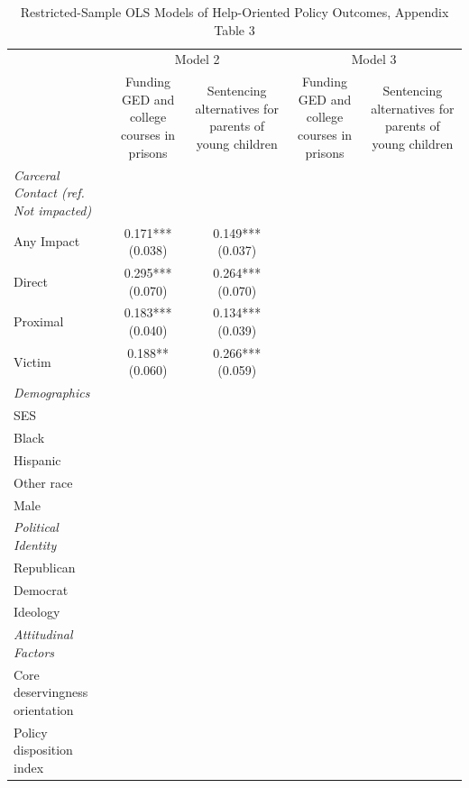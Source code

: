 \begin{table}[!htbp]
\centering
\caption{Restricted-Sample OLS Models of Help-Oriented Policy Outcomes, Appendix Table 3}
\label{tab:appendix\_help\_restricted\_3}
\begin{threeparttable}
\begin{tabular}{lcccc}
\toprule
 & \multicolumn{2}{c}{Model 2} & \multicolumn{2}{c}{Model 3}
 \\
\cmidrule(lr){2-3} \cmidrule(lr){4-5}
 & Funding GED and college courses in prisons & Sentencing alternatives for parents of young children & Funding GED and college courses in prisons & Sentencing alternatives for parents of young children
 \\
\midrule
\textit{Carceral Contact (ref. Not impacted)} &  &  &  & 
\\
Any Impact & \makecell[c]{0.171*** \\ (0.038)} & \makecell[c]{0.149*** \\ (0.037)} &  &  \\
Direct & \makecell[c]{0.295*** \\ (0.070)} & \makecell[c]{0.264*** \\ (0.070)} &  &  \\
Proximal & \makecell[c]{0.183*** \\ (0.040)} & \makecell[c]{0.134*** \\ (0.039)} &  &  \\
Victim & \makecell[c]{0.188** \\ (0.060)} & \makecell[c]{0.266*** \\ (0.059)} &  &  \\
\addlinespace
\textit{Demographics} &  &  &  &  \\
SES &  &  &  &  \\
Black &  &  &  &  \\
Hispanic &  &  &  &  \\
Other race &  &  &  &  \\
Male &  &  &  &  \\
\addlinespace
\textit{Political Identity} &  &  &  &  \\
Republican &  &  &  &  \\
Democrat &  &  &  &  \\
Ideology &  &  &  &  \\
\addlinespace
\textit{Attitudinal Factors} &  &  &  &  \\
Core deservingness orientation &  &  &  &  \\
Policy disposition index &  &  &  &  \\

\end{tabular}
\end{threeparttable}
\end{table}
